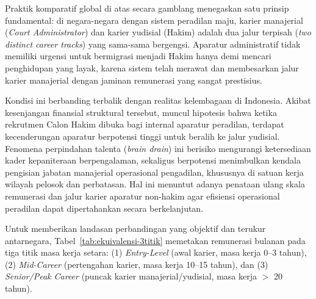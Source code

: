 \documentclass[12pt, a4paper]{article}
\begin{document}
Praktik komparatif global di atas secara gamblang menegaskan satu prinsip fundamental: di negara-negara dengan sistem peradilan maju, karier manajerial (\textit{Court Administrator}) dan karier yudisial (Hakim) adalah dua jalur terpisah (\textit{two distinct career tracks}) yang sama-sama bergengsi. Aparatur administratif tidak memiliki urgensi untuk bermigrasi menjadi Hakim hanya demi mencari penghidupan yang layak, karena sistem telah merawat dan membesarkan jalur karier manajerial dengan jaminan remunerasi yang sangat prestisius.

Kondisi ini berbanding terbalik dengan realitas kelembagaan di Indonesia. Akibat kesenjangan finansial struktural tersebut, muncul hipotesis bahwa ketika rekrutmen Calon Hakim dibuka bagi internal aparatur peradilan, terdapat kecenderungan aparatur berpotensi tinggi untuk beralih ke jalur yudisial. Fenomena perpindahan talenta (\textit{brain drain}) ini berisiko mengurangi ketersediaan kader kepaniteraan berpengalaman, sekaligus berpotensi menimbulkan kendala pengisian jabatan manajerial operasional pengadilan, khususnya di satuan kerja wilayah pelosok dan perbatasan. Hal ini menuntut adanya penataan ulang skala remunerasi dan jalur karier aparatur non-hakim agar efisiensi operasional peradilan dapat dipertahankan secara berkelanjutan.

Untuk memberikan landasan perbandingan yang objektif dan terukur antarnegara, Tabel~\ref{tab:ekuivalensi-3titik} memetakan remunerasi bulanan pada tiga titik masa kerja setara: (1) \textit{Entry-Level} (awal karier, masa kerja 0--3 tahun), (2) \textit{Mid-Career} (pertengahan karier, masa kerja 10--15 tahun), dan (3) \textit{Senior/Peak Career} (puncak karier manajerial/yudisial, masa kerja $>$ 20 tahun).
\end{document}

